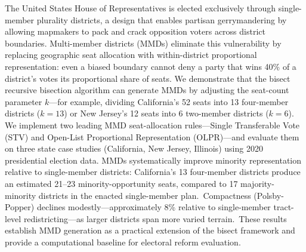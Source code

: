 The United States House of Representatives is elected exclusively through
single-member plurality districts, a design that enables partisan
gerrymandering by allowing mapmakers to pack and crack opposition voters
across district boundaries.  Multi-member districts (MMDs) eliminate this
vulnerability by replacing geographic seat allocation with within-district
proportional representation: even a biased boundary cannot deny a party that
wins 40\% of a district's votes its proportional share of seats.  We
demonstrate that the bisect recursive bisection algorithm can generate
MMDs by adjusting the seat-count parameter $k$---for example, dividing
California's 52 seats into 13 four-member districts ($k=13$) or New Jersey's
12 seats into 6 two-member districts ($k=6$).  We implement two leading MMD
seat-allocation rules---Single Transferable Vote (STV) and Open-List
Proportional Representation (OLPR)---and evaluate them on three state case
studies (California, New Jersey, Illinois) using 2020 presidential election
data.  MMDs systematically improve minority representation relative to
single-member districts: California's 13 four-member districts produce an
estimated 21--23 minority-opportunity seats, compared to 17 majority-minority
districts in the enacted single-member plan.\singrun\  Compactness
(Polsby-Popper) declines modestly---approximately 8\% relative to
single-member tract-level redistricting---as larger districts span more
varied terrain.\singrun\  These results establish MMD generation as a
practical extension of the bisect framework and provide a computational
baseline for electoral reform evaluation.
